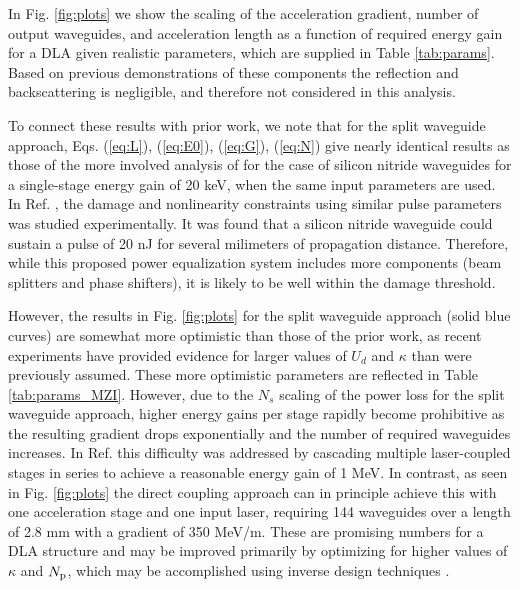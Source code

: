 In Fig. \ref{fig:plots} we show the scaling of the acceleration gradient, number of output waveguides, and acceleration length as a function of required energy gain for a DLA given realistic parameters, which are supplied in Table \ref{tab:params}.  Based on previous demonstrations of these components \cite{annoni_unscrambling_2017, shen_deep_2017} the reflection and backscattering is negligible, and therefore not considered in this analysis.

To connect these results with prior work, we note that for the split waveguide approach, Eqs. (\ref{eq:L}), (\ref{eq:E0}), (\ref{eq:G}), (\ref{eq:N}) give nearly identical results as those of the more involved analysis of \cite{hughes_-chip_2018} for the case of silicon nitride waveguides for a single-stage energy gain of 20 keV, when the same input parameters are used. 
In Ref. \cite{tan2019silicon}, the damage and nonlinearity constraints using similar pulse parameters was studied experimentally. It was found that a silicon nitride waveguide could sustain a pulse of 20 nJ for several milimeters of propagation distance.  Therefore, while this proposed power equalization system includes more components (beam splitters and phase shifters), it is likely to be well within the damage threshold.

However, the results in Fig. \ref{fig:plots} for the split waveguide approach (solid blue curves) are somewhat more optimistic than those of the prior work, as recent experiments \cite{tan2019silicon, bar2019design} have provided evidence for larger values of $U_d$ and $\kappa$ than were previously assumed. These more optimistic parameters are reflected in Table \ref{tab:params_MZI}. However, due to the $N_s$ scaling of the power loss for the split waveguide approach, higher energy gains per stage rapidly become prohibitive as the resulting gradient drops exponentially and the number of required waveguides increases. In Ref. \cite {hughes_-chip_2018} this difficulty was addressed by cascading multiple laser-coupled stages in series to achieve a reasonable energy gain of 1 MeV.  In contrast, as seen in Fig. \ref{fig:plots} the direct coupling approach can in principle achieve this with one acceleration stage and one input laser, requiring 144 waveguides over a length of 2.8 mm with a gradient of 350 MeV/m. These are promising numbers for a DLA structure and may be improved primarily by optimizing for higher values of $\kappa$ and $N_\textrm{p}$, which may be accomplished using inverse design techniques \cite{hughes_method_2017}.

